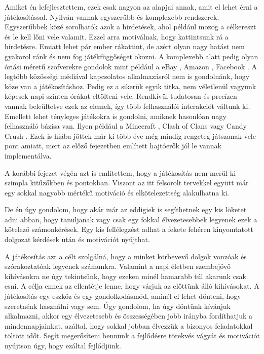 

Amiket én lefejlesztettem, ezek csak nagyon az alapjai annak, amit el lehet érni a játékosítással. Nyilván vannak egyszerűbb és komplexebb rendszerek. Egyszerűbbek közé sorolhatók azok a hirdetések, ahol például mozog a célkereszt és le kell lőni vele valamit. Ezzel arra motiválnak, hogy kattintsunk rá a hirdetésre. Emiatt lehet pár ember rákattint, de azért olyan nagy hatást nem gyakorol ránk és nem fog játékfüggőséget okozni. A komplexebb alatt pedig olyan óriási méretű szofverekre gondolok mint például a eBay \cite{ebay}, Amazon \cite{amazon}, Facebook \cite{facebook}. A legtöbb közösségi médiával kapcsolatos alkalmazásról nem is gondolnánk, hogy köze van a játékosításhoz. Pedig ez a sikerük egyik titka, nem véletlenül vagyunk képesek napi szinten órákat eltölteni vele. Rendkívül tudatosan és precízen vannak beleültetve ezek az elemek, így több felhasználói interakciót váltunk ki. Emellett lehet tényleges játékokra is gondolni, amiknek hasonlóan nagy felhasználó bázisa van. Ilyen például a Minecraft \cite{minecraft}, Clash of Clans \cite{clashOfClans} vagy Candy Crush \cite{candycrush}. Ezek is hiába jöttek már ki több éve még mindig rengeteg játszanak vele pont amiatt, mert az előző fejezetben említett hajtóerők jól le vannak implementálva. \newline

A korábbi fejezet végén azt is említettem, hogy a játékosítás nem merül ki szimpla kitűzőkben és pontokban. Viszont az itt felsorolt tervekkel együtt már egy sokkal nagyobb mértékű motiváció és elkötelezettség alakulhatna ki. \newline

De én úgy gondolom, hogy akár már az eddigiek is segíthetnek egy kis löketet adni abban, hogy tanuljanak vagy csak egy fokkal élvezetesebbek legyenek ezek a kötelező számonkérések. Egy kis fellélegzést adhat a fekete fehéren kinyomtatott dolgozat kérdések után és motivációt nyújthat. \newline

A játékosítás azt a célt szolgálná, hogy a minket körbevevő dolgok vonzóak és szórakoztatóak legyenek számunkra. Valamint a napi életben szembejövő kihívásokra ne úgy tekintsünk, hogy ezeken minél hamarabb túl akarunk csak esni. A célja ennek az ellentétje lenne, hogy várjuk az előttünk álló kihívásokat. A játékosítás egy eszköz és egy gondolkodásmód, aminél el lehet dönteni, hogy szeretnénk használni vagy sem. Úgy gondolom, ha úgy döntünk kívánjuk alkalmazni, akkor egy élvezetesebb és összességében jobb irányba fordíthatjuk a mindennapjainkat, azáltal, hogy sokkal jobban élvezzük a bizonyos feladatokkal töltött időt. Segít megerősíteni bennünk a fejlődésre törekvés vágyát és motivációt nyújtson úgy, hogy ezáltal fejlődjünk.